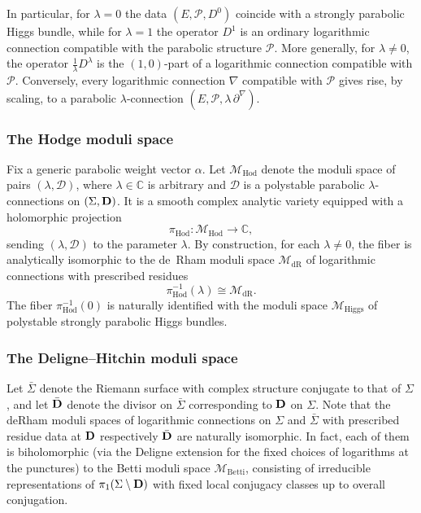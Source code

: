 \documentclass[12pt,a4paper]{amsart}
\theoremstyle{definition}
\theoremstyle{remark}
\newcommand{\C}{\mathbb C}
\newcommand{\Mcal}{\mathcal M}
\begin{document}
In particular, for \(\lambda=0\) the data \((E,\mathcal P,D^0)\) coincide 
with a strongly parabolic Higgs bundle, while for \(\lambda=1\) the 
operator \(D^1\) is an ordinary logarithmic connection compatible with the 
parabolic structure \(\mathcal P\). More generally, for \(\lambda\neq 0\), 
the operator \(\tfrac{1}{\lambda}D^\lambda\) is the \((1,0)\)-part of a 
logarithmic connection compatible with \(\mathcal P\). Conversely, every 
logarithmic connection \(\nabla\) compatible with \(\mathcal P\) gives 
rise, by scaling, to a parabolic \(\lambda\)-connection 
\((E,\mathcal P,\lambda\,\partial^\nabla)\).


 

 
 \subsubsection*{The Hodge moduli space}
Fix a generic parabolic weight vector
$\alpha$.
Let $\Mcal_{\mathrm{Hod}}$ denote the moduli space of 
pairs $(\lambda,\mathcal D)$, where $\lambda\in\C$ is arbitrary and  $\mathcal D$ is a polystable parabolic
$\lambda$-connections on $(\Sigma,{\bf D})$.
It is a smooth complex analytic variety equipped with a holomorphic projection
\[
\pi_{\mathrm{Hod}} \colon \Mcal_{\mathrm{Hod}} \to \C,
\]
sending  $(\lambda,\mathcal D)$ to the parameter
$\lambda$.
By construction, for each $\lambda\neq0$, the fiber 
is analytically isomorphic to the de~Rham moduli space $\Mcal_{\mathrm{dR}}$ of 
logarithmic connections with prescribed residues
\begin{equation}\label{eq:lambdaderham}\pi_{\mathrm{Hod}}^{-1}(\lambda)\cong\Mcal_{\mathrm{dR}}.\end{equation}
The  fiber $\pi_{\mathrm{Hod}}^{-1}(0)$ is naturally identified with the moduli
space $\Mcal_{\mathrm{Higgs}}$ of polystable strongly parabolic Higgs bundles.


\subsubsection*{The Deligne--Hitchin moduli space}
Let $\bar{\Sigma}$ denote the Riemann surface with complex structure conjugate to that
of $\Sigma$, and let $\bar{{\bf D}}$ denote the  divisor on $\bar \Sigma$ corresponding to
${\bf D}$ on $\Sigma$. Note that the deRham moduli spaces of logarithmic connections on $\Sigma$ and $\bar\Sigma$  with prescribed residue data at ${\bf D}$ respectively $\bar{\bf D}$
are naturally isomorphic. In fact, each of them is biholomorphic
(via the Deligne extension for the fixed choices of logarithms at the punctures)
to the
Betti moduli space
$\Mcal_{\mathrm{Betti}}$, consisting of irreducible representations of
$\pi_1(\Sigma\setminus{\bf D})$ with fixed local conjugacy classes up to overall conjugation.
\end{document}
